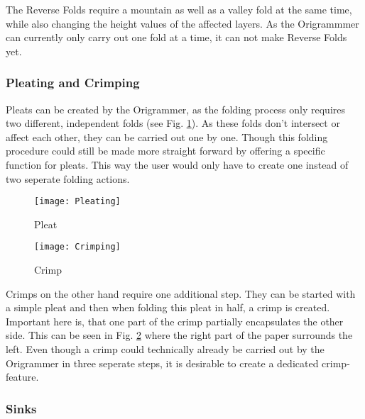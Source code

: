 \noindent The Reverse Folds require a mountain as well as a valley fold at the same time, while also changing the height values of the affected layers. As the Origrammmer can currently only carry out one fold at a time, it can not make Reverse Folds yet.

\subsubsection*{Pleating and Crimping}

Pleats can be created by the Origrammer, as the folding process only requires two different, independent folds (see Fig. \ref{fig:pleating}). As these folds don't intersect or affect each other, they can be carried out one by one. Though this folding procedure could still be made more straight forward by offering a specific function for pleats. This way the user would only have to create one instead of two seperate folding actions.
\begin{figure*}[htbp]
	\centering
	\begin{subfigure}{0.49\textwidth}
		\texttt{[image: Pleating]}
		\caption{Pleat}
		\label{fig:pleating}
	\end{subfigure}
	\begin{subfigure}{0.49\textwidth}
		\texttt{[image: Crimping]}
		\caption{Crimp}
		\label{fig:crimping}
	\end{subfigure}
	\caption{Pleats and Crimps}
\end{figure*}

\noindent Crimps on the other hand require one additional step. They can be started with a simple pleat and then when folding this pleat in half, a crimp is created. Important here is, that one part of the crimp partially encapsulates the other side. This can be seen in Fig. \ref{fig:crimping} where the right part of the paper surrounds the left. Even though a crimp could technically already be carried out by the Origrammer in three seperate steps, it is desirable to create a dedicated crimp-feature.

\subsubsection*{Sinks}

